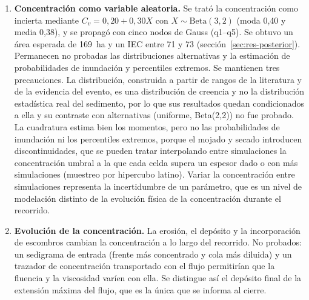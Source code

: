 \begin{enumerate}
\item \textbf{Concentración como variable aleatoria.} Se trató la concentración como incierta mediante $C_v=0{,}20+0{,}30X$ con $X\sim\mathrm{Beta}(3,2)$ (moda 0,40 y media 0,38), y se propagó con cinco nodos de Gauss (q1--q5). Se obtuvo un área esperada de \SI{169}{ha} y un IEC entre 71 y 73 (sección~\ref{sec:res-posterior}). Permanecen no probadas las distribuciones alternativas y la estimación de probabilidades de inundación y percentiles extremos. Se mantienen tres precauciones. La distribución, construida a partir de rangos de la literatura y de la evidencia del evento, es una distribución de creencia y no la distribución estadística real del sedimento, por lo que sus resultados quedan condicionados a ella y su contraste con alternativas (uniforme, Beta(2,2)) no fue probado. La cuadratura estima bien los momentos, pero no las probabilidades de inundación ni los percentiles extremos, porque el mojado y secado introducen discontinuidades, que se pueden tratar interpolando entre simulaciones la concentración umbral a la que cada celda supera un espesor dado o con más simulaciones (muestreo por hipercubo latino). Variar la concentración entre simulaciones representa la incertidumbre de un parámetro, que es un nivel de modelación distinto de la evolución física de la concentración durante el recorrido.
\item \textbf{Evolución de la concentración.} La erosión, el depósito y la incorporación de escombros cambian la concentración a lo largo del recorrido. No probados: un sedigrama de entrada (frente más concentrado y cola más diluida) y un trazador de concentración transportado con el flujo permitirían que la fluencia y la viscosidad varíen con ella. Se distingue así el depósito final de la extensión máxima del flujo, que es la única que se informa al cierre.
\end{enumerate}
